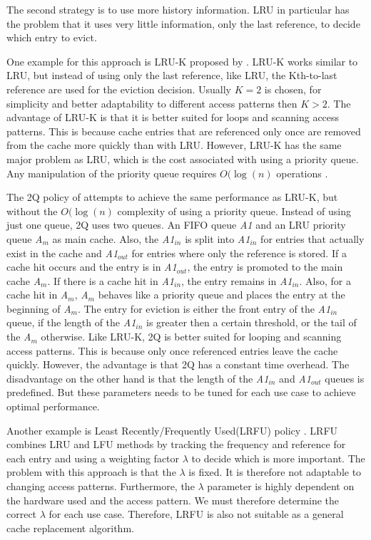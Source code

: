 \documentclass[
	12pt,
	a4paper,
	abstract,
	bibliography=totoc,
	chapterprefix,
	headings=openright,
	numbers=endperiod,
	parskip=half,
	twoside,
]{scrreprt}
\begin{document}
The second strategy is to use more history information.
LRU in particular has the problem that it uses very little information, only the last reference, to decide which entry to evict.

One example for this approach is LRU-K proposed by \cite{o1993lru}.
LRU-K works similar to LRU, but instead of using only the last reference, like LRU,
the Kth-to-last reference are used for the eviction decision. 
Usually $K = 2$ is chosen, for simplicity and better adaptability to different access patterns then $K > 2$.
The advantage of LRU-K is that it is better suited for loops and scanning access patterns.
This is because cache entries that are referenced only once are removed from the cache more quickly than with LRU.
However, LRU-K has the same major problem as LRU, which is the cost associated with using a priority queue.
Any manipulation of the priority queue requires $O(\log(n)$ operations \cite{10.1145/511399.511340}.

The 2Q policy of \cite{shasha19942q} attempts to achieve the same performance as LRU-K, but without the $O(\log(n)$ complexity of using a priority queue.
Instead of using just one queue, 2Q uses two queues.
An FIFO queue \emph{A1} and an LRU priority queue \emph{A$_m$} as main cache.
Also, the \emph{A1$_{in}$} is split into \emph{A1$_{in}$} for entries that actually exist in the cache and \emph{A1$_{out}$} for entries where only the reference is stored.
If a cache hit occurs and the entry is in \emph{A1$_{out}$}, the entry is promoted to the main cache \emph{A$_m$}.
If there is a cache hit in \emph{A1$_{in}$}, the entry remains in \emph{A1$_{in}$}.
Also, for a cache hit in \emph{A$_m$}, \emph{A$_m$} behaves like a priority queue and places the entry at the beginning of \emph{A$_m$}.
The entry for eviction is either the front entry of the \emph{A1$_{in}$} queue, if the length of the \emph{A1$_{in}$} is greater then a certain threshold, or the tail of the 
\emph{A$_m$} otherwise.
Like LRU-K, 2Q is better suited for looping and scanning access patterns.
This is because only once referenced entries leave the cache quickly.
However, the advantage is that 2Q has a constant time overhead.
The disadvantage on the other hand is that the 
length of the \emph{A1$_{in}$} and \emph{A1$_{out}$} queues is predefined.
But these parameters needs to be tuned for each use case to achieve optimal performance.

Another example is Least Recently/Frequently Used(LRFU) policy \cite{lee2001lrfu}.
LRFU combines LRU and LFU methods by tracking the frequency and reference for each entry and using a weighting factor $\lambda$ to decide which is more important.
The problem with this approach is that the $\lambda$ is fixed.
It is therefore not adaptable to changing access patterns.
Furthermore, the $\lambda$ parameter is highly dependent on the hardware used and the access pattern.
We must therefore determine the correct $\lambda$ for each use case.
Therefore, LRFU is also not suitable as a general cache replacement algorithm.
\end{document}
